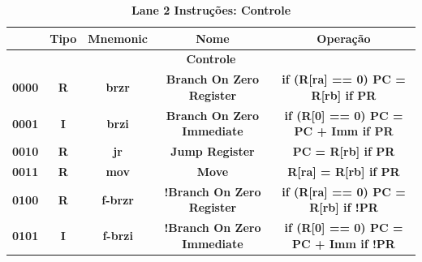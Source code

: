 \documentclass{article}
\begin{document}
    \begin{table}[H]
      \centering
      \captionsetup{labelformat=empty, skip=0pt}
      \caption{\textbf{Lane 2 Instruções: Controle}}
      \noindent\hspace*{-3.5cm}
      \begin{tabular}{|c|*{4}{c|}}
        \hline
        \rowcolor{gray!50}
        \multicolumn{1}{|c|}{\textbf{Opcode}} & \multicolumn{1}{|c|}{\textbf{Tipo}} & \multicolumn{1}{|c|}{\textbf{Mnemonic}} & \multicolumn{1}{|c|}{\textbf{Nome}}                     & \multicolumn{1}{|c|}{\textbf{Operação}}                                        \\ \hline
        \multicolumn{5}{|c|}{\textbf{Controle}} \\ \hline 
        \multicolumn{1}{|c|}{\textbf{0000}}   & \multicolumn{1}{c|}{\textbf{R}}     & \multicolumn{1}{c|}{\textbf{brzr}}      & \multicolumn{1}{c|}{\textbf{Branch On Zero Register}}   & \multicolumn{1}{c|}{\textbf{if (R[ra] == 0) PC = R[rb] if PR}}                 \\ \hline
        \multicolumn{1}{|c|}{\textbf{0001}}   & \multicolumn{1}{c|}{\textbf{I}}     & \multicolumn{1}{c|}{\textbf{brzi}}      & \multicolumn{1}{c|}{\textbf{Branch On Zero Immediate}}  & \multicolumn{1}{c|}{\textbf{if (R[0] == 0) PC = PC + Imm if PR}}               \\ \hline
        \multicolumn{1}{|c|}{\textbf{0010}}   & \multicolumn{1}{c|}{\textbf{R}}     & \multicolumn{1}{c|}{\textbf{jr}}        & \multicolumn{1}{c|}{\textbf{Jump Register}}             & \multicolumn{1}{c|}{\textbf{PC = R[rb] if PR}}                                 \\ \hline
        \multicolumn{1}{|c|}{\textbf{0011}}   & \multicolumn{1}{c|}{\textbf{R}}     & \multicolumn{1}{c|}{\textbf{mov}}       & \multicolumn{1}{c|}{\textbf{Move}}                      & \multicolumn{1}{c|}{\textbf{R[ra] = R[rb] if PR}}                              \\ \hline
        \multicolumn{1}{|c|}{\textbf{0100}}   & \multicolumn{1}{c|}{\textbf{R}}     & \multicolumn{1}{c|}{\textbf{f-brzr}}    & \multicolumn{1}{c|}{\textbf{!Branch On Zero Register}}  & \multicolumn{1}{c|}{\textbf{if (R[ra] == 0) PC = R[rb] if !PR}}                \\ \hline
        \multicolumn{1}{|c|}{\textbf{0101}}   & \multicolumn{1}{c|}{\textbf{I}}     & \multicolumn{1}{c|}{\textbf{f-brzi}}    & \multicolumn{1}{c|}{\textbf{!Branch On Zero Immediate}} & \multicolumn{1}{c|}{\textbf{if (R[0] == 0) PC = PC + Imm if !PR}}              \\ \hline

\end{tabular}
\end{table}
\end{document}
